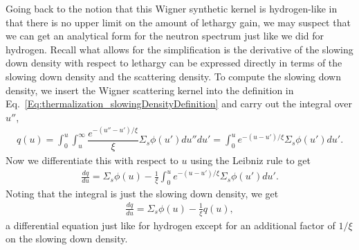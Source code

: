 Going back to the notion that this Wigner synthetic kernel is hydrogen-like in that there is no upper limit on the amount of lethargy gain, we may suspect that we can get an analytical form for the neutron spectrum just like we did for hydrogen. Recall what allows for the simplification is the derivative of the slowing down density with respect to lethargy can be expressed directly in terms of the slowing down density and the scattering density. To compute the slowing down density, we insert the Wigner scattering kernel into the definition in Eq.~\eqref{Eq:thermalization_slowingDensityDefinition} and carry out the integral over $u''$,
\begin{align}
  q(u) = \int_0^u \int_u^\infty \dfrac{ e^{-(u''-u')/\xi}}{\xi} \Sigma_s \phi(u') du'' du' = \int_0^u e^{-(u - u')/\xi} \Sigma_s \phi(u') du' .
\end{align}
Now we differentiate this with respect to $u$ using the Leibniz rule to get
\begin{align}
  \frac{dq}{du} = \Sigma_s \phi(u) - \frac{1}{\xi} \int_0^u  e^{-(u-u')/\xi} \Sigma_s \phi(u') du' . \label{Eq:thermalization_derivativeSlowingDownDensity_WignerScatteringKernel}
\end{align}
Noting that the integral is just the slowing down density, we get
\begin{align}
  \frac{dq}{du} = \Sigma_s \phi(u) - \frac{1}{\xi} q(u) , \label{Eq:thermalization_derivativeSlowingDownDensity_Wigner}
\end{align}
a differential equation just like for hydrogen except for an additional factor of $1/\xi$ on the slowing down density.

